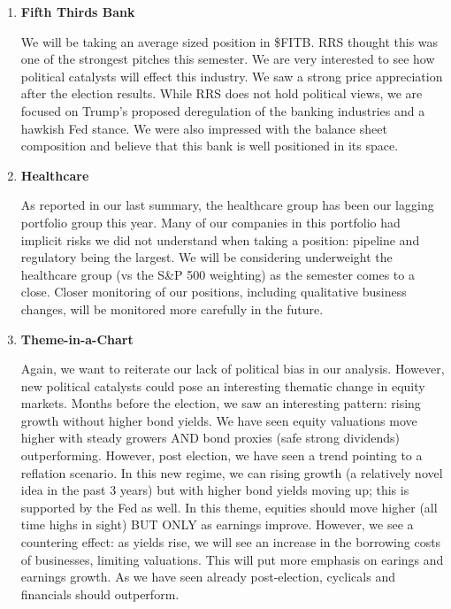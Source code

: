 \documentclass[11pt,pressrelease]{newlfm} %
\begin{document}
\begin{newlfm}


\vspace{-.25 in} 			%
\begin{singlespace} 		%

\begin{enumerate}
\item \textbf{Fifth Thirds Bank } \par
We will be taking an average sized position in \$FITB. RRS thought this was one of the strongest pitches this semester. We are very interested to see how political catalysts will effect this industry. We saw a strong price appreciation after the election results. While RRS does not hold political views, we are focused on  Trump's proposed deregulation of the banking industries and a hawkish Fed stance. We were also impressed with the balance sheet composition and believe that this bank is well positioned in its space. 

\item \textbf{Healthcare} \par
As reported in our last summary, the healthcare group has been our lagging portfolio group this year. Many of our companies in this portfolio had implicit risks we did not understand when taking a position: pipeline and regulatory being the largest. We will be considering underweight the healthcare group (vs the S\&P 500 weighting) as the semester comes to a close. Closer monitoring of our positions, including qualitative business changes, will be monitored more carefully in the future. 

\item \textbf{Theme-in-a-Chart} \par
Again, we want to reiterate our lack of political bias in our analysis. However, new political catalysts could pose an interesting thematic change in equity markets. Months before the election, we saw an interesting pattern: rising growth without higher bond yields. We have seen equity valuations move higher with steady growers AND bond proxies (safe strong dividends) outperforming.  However, post election, we have seen a trend pointing to a reflation scenario. In this new regime, we can rising growth (a relatively novel idea in the past 3 years) but with higher bond yields moving up; this is supported by the Fed as well. In this theme, equities should move higher (all time highs in sight) BUT ONLY as earnings improve. However, we see a countering effect: as yields rise, we will see an increase in the borrowing costs of businesses, limiting valuations. This will put more emphasis on earings and earnings growth. As we have seen already post-election, cyclicals and financials should outperform.


\end{enumerate}
\end{singlespace}
\end{newlfm}
\end{document}
